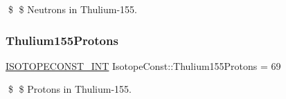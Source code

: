 \$ \$ Neutrons in Thulium-\/155. \mbox{\label{group___isotope_const-_thulium-_tm155_gaa769feb2b64c9afb19bd97a027c46e0a}} 
\subsubsection{\texorpdfstring{Thulium155\+Protons}{Thulium155Protons}}
{\footnotesize\ttfamily \mbox{\hyperlink{group___isotope_const-_macros_ga5f18360b3e99483a35c32d789e62621c}{I\+S\+O\+T\+O\+P\+E\+C\+O\+N\+S\+T\+\_\+\+I\+NT}} Isotope\+Const\+::\+Thulium155\+Protons = 69}

\$ \$ Protons in Thulium-\/155. 